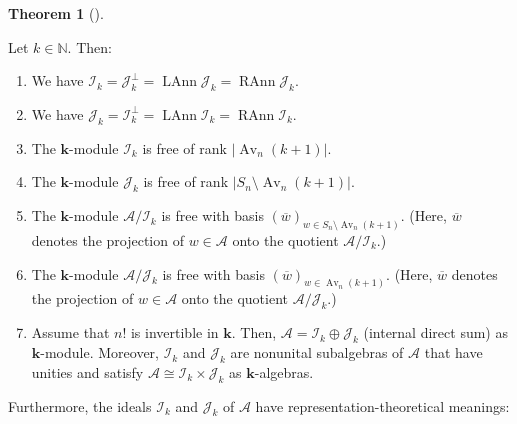 \documentclass[numbers=enddot,12pt,final,onecolumn,notitlepage]{scrartcl}%
\numberwithin{exer}{subsection}
\theoremstyle{definition}
\newtheorem{theo}{Theorem}[subsection]
\newenvironment{theorem}[1][]
{\begin{theo}[#1]\begin{leftbar}}
{\end{leftbar}\end{theo}}
\begin{document}
\begin{theorem}
\label{thm.row.main}Let $k\in\mathbb{N}$. Then:

\begin{enumerate}
\item[\textbf{(a)}] We have $\mathcal{I}_{k}=\mathcal{J}_{k}^{\perp
}=\operatorname*{LAnn}\mathcal{J}_{k}=\operatorname*{RAnn}\mathcal{J}_{k}$.

\item[\textbf{(b)}] We have $\mathcal{J}_{k}=\mathcal{I}_{k}^{\perp
}=\operatorname*{LAnn}\mathcal{I}_{k}=\operatorname*{RAnn}\mathcal{I}_{k}$.

\item[\textbf{(c)}] The $\mathbf{k}$-module $\mathcal{I}_{k}$ is free of rank
$\left\vert \operatorname*{Av}\nolimits_{n}\left(  k+1\right)  \right\vert $.

\item[\textbf{(d)}] The $\mathbf{k}$-module $\mathcal{J}_{k}$ is free of rank
$\left\vert S_{n}\setminus\operatorname*{Av}\nolimits_{n}\left(  k+1\right)
\right\vert $.

\item[\textbf{(e)}] The $\mathbf{k}$-module $\mathcal{A}/\mathcal{I}_{k}$ is
free with basis $\left(  \overline{w}\right)  _{w\in S_{n}\setminus
\operatorname*{Av}\nolimits_{n}\left(  k+1\right)  }$. (Here, $\overline{w}$
denotes the projection of $w\in\mathcal{A}$ onto the quotient $\mathcal{A}%
/\mathcal{I}_{k}$.)

\item[\textbf{(f)}] The $\mathbf{k}$-module $\mathcal{A}/\mathcal{J}_{k}$ is
free with basis $\left(  \overline{w}\right)  _{w\in\operatorname*{Av}%
\nolimits_{n}\left(  k+1\right)  }$. (Here, $\overline{w}$ denotes the
projection of $w\in\mathcal{A}$ onto the quotient $\mathcal{A}/\mathcal{J}%
_{k}$.)

\item[\textbf{(g)}] Assume that $n!$ is invertible in $\mathbf{k}$. Then,
$\mathcal{A}=\mathcal{I}_{k}\oplus\mathcal{J}_{k}$ (internal direct sum) as
$\mathbf{k}$-module. Moreover, $\mathcal{I}_{k}$ and $\mathcal{J}_{k}$ are
nonunital subalgebras of $\mathcal{A}$ that have unities and satisfy
$\mathcal{A}\cong\mathcal{I}_{k}\times\mathcal{J}_{k}$ as $\mathbf{k}$-algebras.\footnotemark
\end{enumerate}
\end{theorem}


Furthermore, the
ideals $\mathcal{I}_{k}$ and $\mathcal{J}_{k}$ of $\mathcal{A}$ have
representation-theoretical meanings:
\end{document}
